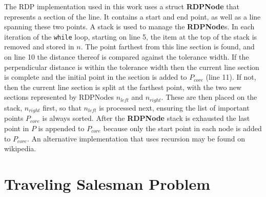 The RDP implementation used in this work uses a struct \textbf{RDPNode} that represents a section of the line.
It contains a start and end point, as well as a line spanning these two points.
A stack is used to manage the \textbf{RDPNode}s.
In each iteration of the \verb|while| loop, starting on line 5, the item at the top of the stack is removed and stored in $n$.
The point farthest from this line section is found, and on line 10 the distance thereof is compared against the tolerance width.
If the perpendicular distance is within the tolerance width then the current line section is complete and the initial point in the section is added to $P_{core}$ (line 11).
If not, then the current line section is split at the farthest point, with the two new sections represented by RDPNodes $n_{left}$ and $n_{right}$.
These are then placed on the stack, $n_{right}$ first, so that $n_{left}$ is processed next, ensuring the list of important points $P_{core}$ is always sorted.
After the \textbf{RDPNode} stack is exhausted the last point in $P$ is appended to $P_{core}$ because only the start point in each node is added to $P_{core}$.
An alternative implementation that uses recursion may be found on wikipedia.

\section{Traveling Salesman Problem}


